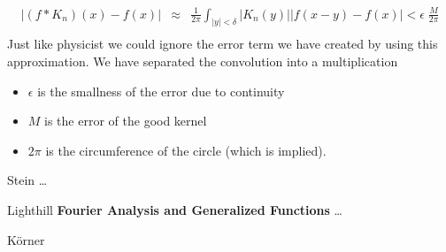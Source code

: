 \documentclass[12pt]{article}
\begin{document}
\begin{eqnarray*}
|(f*K_n)(x) - f(x)| & \approx & \frac{1}{2\pi} \int_{|y|< \delta } |K_n(y)| |f(x-y) - f(x)| < \epsilon \; \frac{M}{2\pi} \\
\end{eqnarray*}  
Just like physicist we could ignore the error term we have created by using this approximation.  We have separated the convolution into a multiplication
\begin{itemize}
\item $\epsilon$ is the smallness of the error due to continuity
\item $M$ is the error of the good kernel
\item $2\pi$ is the circumference of the circle (which is implied). 
\end{itemize}
\vfill



\begin{thebibliography}{}

\item Stein \dots
\item Lighthill \textbf{Fourier Analysis and Generalized Functions} \dots
\item K\"{o}rner 
\end{thebibliography}
\end{document}
